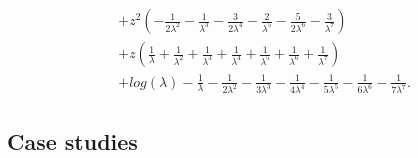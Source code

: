 \begin{remark}
\begin{displaymath}
\begin{split}
&+ z^{2} \left(- \frac{1}{2 \lambda^{2}} - \frac{1}{\lambda^{3}} - \frac{3}{2 \lambda^{4}} - \frac{2}{\lambda^{5}} - \frac{5}{2 \lambda^{6}} - \frac{3}{\lambda^{7}}\right) \\
&+ z \left(\frac{1}{\lambda} + \frac{1}{\lambda^{2}} + \frac{1}{\lambda^{3}} + \frac{1}{\lambda^{4}} + \frac{1}{\lambda^{5}} + \frac{1}{\lambda^{6}} + \frac{1}{\lambda^{7}}\right) \\
&+ log{\left (\lambda \right )} - \frac{1}{\lambda} - \frac{1}{2 \lambda^{2}} - \frac{1}{3 \lambda^{3}} - \frac{1}{4 \lambda^{4}} - \frac{1}{5 \lambda^{5}} - \frac{1}{6 \lambda^{6}} - \frac{1}{7 \lambda^{7}}.
\end{split}
\end{displaymath}
\end{remark}






\subsection{Case studies}




\vfill







